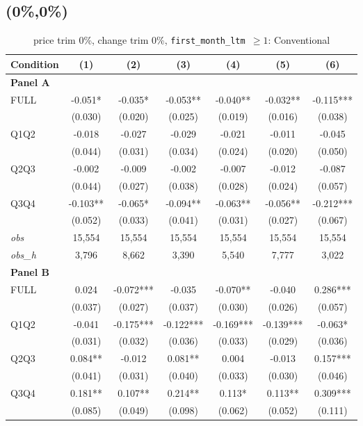 \subsection{(0\%,0\%)}
\begin{table}[!htbp]
\centering
\caption{price trim 0\%, change trim 0\%, \texttt{first\_month\_ltm $\geq 1$}: Conventional}
\label{tab:abc:trim00:ltm1:conventional:bal}
\small
\begin{tabular}{lcccccc}
\toprule
Condition & (1) & (2) & (3) & (4) & (5) & (6) \\
\midrule
\textbf{Panel A} &&&&&&  \\

FULL & -0.051* & -0.035* & -0.053** & -0.040** & -0.032** & -0.115*** \\
 & (0.030) & (0.020) & (0.025) & (0.019) & (0.016) & (0.038) \\
Q1Q2 & -0.018 & -0.027 & -0.029 & -0.021 & -0.011 & -0.045 \\
 & (0.044) & (0.031) & (0.034) & (0.024) & (0.020) & (0.050) \\
Q2Q3 & -0.002 & -0.009 & -0.002 & -0.007 & -0.012 & -0.087 \\
 & (0.044) & (0.027) & (0.038) & (0.028) & (0.024) & (0.057) \\
Q3Q4 & -0.103** & -0.065* & -0.094** & -0.063** & -0.056** & -0.212*** \\
 & (0.052) & (0.033) & (0.041) & (0.031) & (0.027) & (0.067) \\

\textit{obs} & 15,554 & 15,554 & 15,554 & 15,554 & 15,554 & 15,554 \\
\textit{obs\_h} & 3,796 & 8,662 & 3,390 & 5,540 & 7,777 & 3,022 \\

\textbf{Panel B} &&&&&&  \\

FULL & 0.024 & -0.072*** & -0.035 & -0.070** & -0.040 & 0.286*** \\
 & (0.037) & (0.027) & (0.037) & (0.030) & (0.026) & (0.057) \\
Q1Q2 & -0.041 & -0.175*** & -0.122*** & -0.169*** & -0.139*** & -0.063* \\
 & (0.031) & (0.032) & (0.036) & (0.033) & (0.029) & (0.036) \\
Q2Q3 & 0.084** & -0.012 & 0.081** & 0.004 & -0.013 & 0.157*** \\
 & (0.041) & (0.031) & (0.040) & (0.033) & (0.030) & (0.046) \\
Q3Q4 & 0.181** & 0.107** & 0.214** & 0.113* & 0.113** & 0.309*** \\
 & (0.085) & (0.049) & (0.098) & (0.062) & (0.052) & (0.111) \\


\end{tabular}
\end{table}

